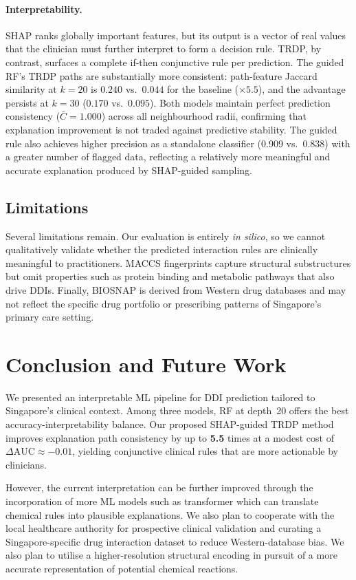 \documentclass[letterpaper]{article} %
\begin{document}
\paragraph{Interpretability.}
SHAP ranks globally important features, but its output is a vector of real values that the clinician must further interpret to form a decision rule. TRDP, by contrast, surfaces a complete if-then conjunctive rule per prediction. The guided RF's TRDP paths are substantially more consistent: path-feature Jaccard similarity at $k=20$ is $0.240$ vs.\ $0.044$ for the baseline (${\times}5.5$), and the advantage persists at $k=30$ ($0.170$ vs.\ $0.095$). Both models maintain perfect prediction consistency ($\bar{C}=1.000$) across all neighbourhood radii, confirming that explanation improvement is not traded against predictive stability. The guided rule also achieves higher precision as a standalone classifier (0.909 vs.\ 0.838) with a greater number of flagged data, reflecting a relatively more meaningful and accurate explanation produced by SHAP-guided sampling.

\subsection{Limitations}
Several limitations remain. Our evaluation is entirely \textit{in silico}, so we cannot qualitatively validate whether the predicted interaction rules are clinically meaningful to practitioners. MACCS fingerprints capture structural substructures but omit properties such as protein binding and metabolic pathways that also drive DDIs. Finally, BIOSNAP is derived from Western drug databases and may not reflect the specific drug portfolio or prescribing patterns of Singapore's primary care setting.

\section{Conclusion and Future Work}
We presented an interpretable ML pipeline for DDI prediction tailored to Singapore's clinical context. Among three models, RF at depth~20 offers the best accuracy-interpretability balance. Our proposed SHAP-guided TRDP method improves explanation path consistency by up to \textbf{5.5} times at a modest cost of $\Delta\text{AUC}\approx{-0.01}$, yielding conjunctive clinical rules that are more actionable by clinicians. 

However, the current interpretation can be further improved through the incorporation of more ML models such as transformer which can translate chemical rules into plausible explanations. We also plan to cooperate with the local healthcare authority for prospective clinical validation and curating a Singapore-specific drug interaction dataset to reduce Western-database bias. We also plan to utilise a higher-resolution structural encoding in pursuit of a more accurate representation of potential chemical reactions.
\end{document}
